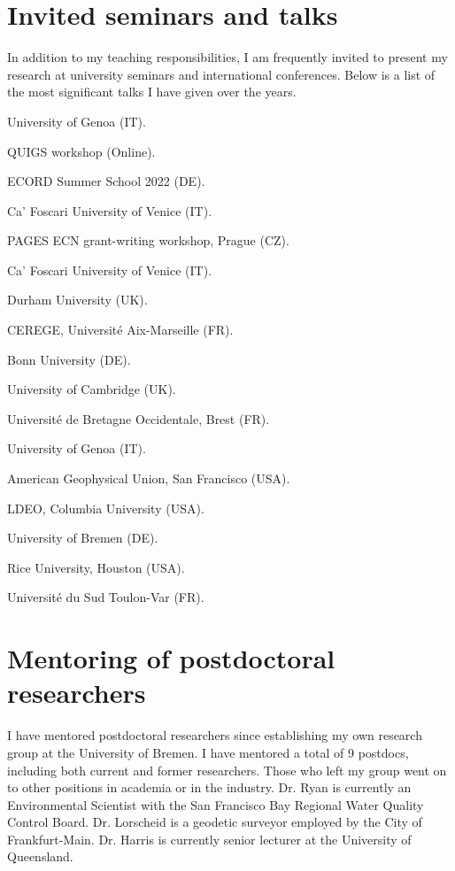 \documentclass[11pt]{article}
\begin{document}
\section{Invited seminars and talks}
{\normalfont In addition to my teaching responsibilities, I am frequently invited to present my research at university seminars and international conferences. Below is a list of the most significant talks I have given over the years.}\\
{\footnotesize 
\begin{description}
  \item [2023] University of Genoa (IT).
  \item [2023] QUIGS workshop (Online).
  \item [2022] ECORD Summer School 2022 (DE).
  \item [2021] Ca’ Foscari University of Venice (IT).
  \item [2019] PAGES ECN grant-writing workshop, Prague (CZ).
  \item [2018] Ca’ Foscari University of Venice (IT).
  \item [2018] Durham University (UK).
  \item [2018] CEREGE, Université Aix-Marseille (FR).
  \item [2017] Bonn University (DE).
  \item [2017] University of Cambridge (UK).
  \item [2017] Université de Bretagne Occidentale, Brest (FR).
  \item [2017] University of Genoa (IT).
  \item [2016] American Geophysical Union, San Francisco (USA).
  \item [2015] LDEO, Columbia University (USA).
  \item [2013] University of Bremen (DE).
  \item [2012] Rice University, Houston (USA).
  \item [2008] Université du Sud Toulon-Var (FR).
  \item \end{description}}

\newpage
\section{Mentoring of postdoctoral researchers}
{\normalfont I have mentored postdoctoral researchers since establishing my own research group at the University of Bremen. I have mentored a total of 9 postdocs, including both current and former researchers. Those who left my group went on to other positions in academia or in the industry. Dr. Ryan is currently an Environmental Scientist with the San Francisco Bay Regional Water Quality Control Board. Dr. Lorscheid is a geodetic surveyor employed by the City of Frankfurt-Main. Dr. Harris is currently senior lecturer at the University of Queensland.}
\end{document}
